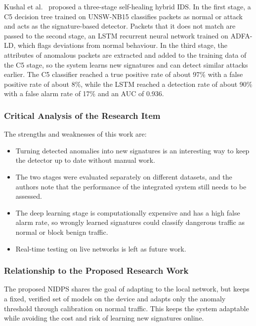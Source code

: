 \noindent Kushal et al.~\cite{lr:kushal2024} proposed a three-stage self-healing hybrid IDS. In the first stage, a C5 decision tree trained on UNSW-NB15 classifies packets as normal or attack and acts as the signature-based detector. Packets that it does not match are passed to the second stage, an LSTM recurrent neural network trained on ADFA-LD, which flags deviations from normal behaviour. In the third stage, the attributes of anomalous packets are extracted and added to the training data of the C5 stage, so the system learns new signatures and can detect similar attacks earlier. The C5 classifier reached a true positive rate of about 97\% with a false positive rate of about 8\%, while the LSTM reached a detection rate of about 90\% with a false alarm rate of 17\% and an AUC of 0.936.

\subsubsection{Critical Analysis of the Research Item}\label{sec:3.2.4.2}

\noindent The strengths and weaknesses of this work are:

\begin{itemize}
\item Turning detected anomalies into new signatures is an interesting way to keep the detector up to date without manual work.
\item The two stages were evaluated separately on different datasets, and the authors note that the performance of the integrated system still needs to be assessed.
\item The deep learning stage is computationally expensive and has a high false alarm rate, so wrongly learned signatures could classify dangerous traffic as normal or block benign traffic.
\item Real-time testing on live networks is left as future work.
\end{itemize}

\subsubsection{Relationship to the Proposed Research Work}\label{sec:3.2.4.3}

\noindent The proposed NIDPS shares the goal of adapting to the local network, but keeps a fixed, verified set of models on the device and adapts only the anomaly threshold through calibration on normal traffic. This keeps the system adaptable while avoiding the cost and risk of learning new signatures online.

